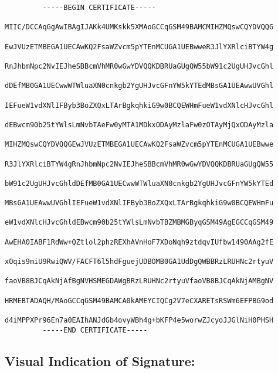 \bigskip

\begin{verbatim}
         -----BEGIN CERTIFICATE-----
         MIIC/DCCAqGgAwIBAgIJAKk4UMKskk5XMAoGCCqGSM49BAMCMIHZMQswCQYDVQQG
         EwJVUzETMBEGA1UECAwKQ2FsaWZvcm5pYTEnMCUGA1UEBwweR3JlYXRlciBTYW4g
         RnJhbmNpc2NvIEJheSBBcmVhMR0wGwYDVQQKDBRUaGUgQW55bW91c2UgUHJvcGhl
         dDEfMB0GA1UECwwWTWluaXN0cnkgb2YgUHJvcGFnYW5kYTEdMBsGA1UEAwwUVGhl
         IEFueW1vdXNlIFByb3BoZXQxLTArBgkqhkiG9w0BCQEWHmFueW1vdXNlcHJvcGhl
         dEBwcm90b25tYWlsLmNvbTAeFw0yMTA1MDkxODAyMzlaFw0zOTAyMjQxODAyMzla
         MIHZMQswCQYDVQQGEwJVUzETMBEGA1UECAwKQ2FsaWZvcm5pYTEnMCUGA1UEBwwe
         R3JlYXRlciBTYW4gRnJhbmNpc2NvIEJheSBBcmVhMR0wGwYDVQQKDBRUaGUgQW55
         bW91c2UgUHJvcGhldDEfMB0GA1UECwwWTWluaXN0cnkgb2YgUHJvcGFnYW5kYTEd
         MBsGA1UEAwwUVGhlIEFueW1vdXNlIFByb3BoZXQxLTArBgkqhkiG9w0BCQEWHmFu
         eW1vdXNlcHJvcGhldEBwcm90b25tYWlsLmNvbTBZMBMGByqGSM49AgEGCCqGSM49
         AwEHA0IABF1RdWw+QZtlol2phzREXhAVnHoF7XDoNqh9ztdqvIUfbw1490AAg2fE
         xOqis9miU9RwiQWV/FACFT6l5hdFguejUDBOMB0GA1UdDgQWBBRzLRUHNc2rtyuV
         faoVB8BJCqAkNjAfBgNVHSMEGDAWgBRzLRUHNc2rtyuVfaoVB8BJCqAkNjAMBgNV
         HRMEBTADAQH/MAoGCCqGSM49BAMCA0kAMEYCIQCg2V7eCXARETsRSWm6EFPBG9od
         d4iMPPXPr96En7a0EAIhANJdGb4ovyWBh4g+bKFP4e5worwZJcyoJJGlNiH0PHSH
         -----END CERTIFICATE-----
\end{verbatim}

\clearpage

\subsection*{Visual Indication of Signature:}

\begin{Form}
\end{Form}
